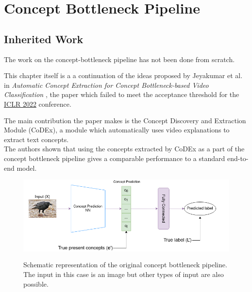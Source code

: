\chapter{Concept Bottleneck Pipeline}
\label{concept-bottleneck-pipeline}





\section{Inherited Work}
\label{inherited-work}

The work on the concept-bottleneck pipeline has not been done from scratch.

This chapter itself is a a continuation of the ideas proposed by Jeyakumar et al. in \emph{Automatic Concept Extraction for Concept Bottleneck-based Video Classification} \cite{RefWorks:RefID:16-2021automatic}, the paper which failed to meet the acceptance threshold for the \href{https://iclr.cc/}{ICLR 2022} conference. 

The main contribution the paper makes is the Concept Discovery and Extraction Module (CoDEx), a module which automatically uses video explanations to extract text concepts. \\
The authors shown that using the concepts extracted by CoDEx as a part of the concept bottleneck pipeline gives a comparable performance to a standard end-to-end model. 

\begin{figure}[h]
\caption{Schematic representation of the original concept bottleneck pipeline. The input in this case is an image but other types of input are also possible.}
\vspace{5pt}
\centering
\includegraphics[width=\textwidth]{concept-bottleneck-pipeline/original-concept-bottleneck-model.png}
\label{original-concept-bottleneck}
\end{figure}

